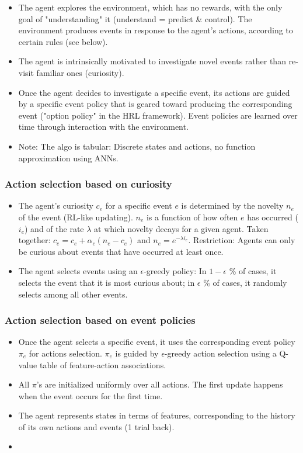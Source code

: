 \documentclass{article}
\begin{document}
\begin{itemize}
	\item The agent explores the environment, which has no rewards, with the only goal of "understanding" it (understand = predict \& control). The environment produces events in response to the agent's actions, according to certain rules (see below).
	\item The agent is intrinsically motivated to investigate novel events rather than re-visit familiar ones (curiosity).
	\item Once the agent decides to investigate a specific event, its actions are guided by a specific event policy that is geared toward producing the corresponding event ("option policy" in the HRL framework). Event policies are learned over time through interaction with the environment.
	\item Note: The algo is tabular: Discrete states and actions, no function approximation using ANNs.
\end{itemize}

\subsubsection{Action selection based on curiosity}

\begin{itemize}
	\item The agent's curiosity $c_e$ for a specific event $e$ is determined by the novelty $n_e$ of the event (RL-like updating). $n_e$ is a function of how often $e$ has occurred ($i_e$) and of the rate $\lambda$ at which novelty decays for a given agent. Taken together: $c_e = c_e + \alpha_c (n_e - c_e)$ and $n_e = e^{-\lambda i_e}$. Restriction: Agents can only be curious about events that have occurred at least once. 
	\item The agent selects events using an $\epsilon$-greedy policy: In $1-\epsilon$ \% of cases, it selects the event that it is most curious about; in $\epsilon$ \% of cases, it randomly selects among all other events.
\end{itemize}

\subsubsection{Action selection based on event policies}

\begin{itemize}
	\item Once the agent selects a specific event, it uses the corresponding event policy $\pi_e$ for actions selection. $\pi_e$ is guided by $\epsilon$-greedy action selection using a Q-value table of feature-action associations. 
	\item All $\pi$'s are initialized uniformly over all actions. The first update happens when the event occurs for the first time.
	\item The agent represents states in terms of features, corresponding to the history of its own actions and events (1 trial back). 
	\item 
\end{itemize}
\end{document}

